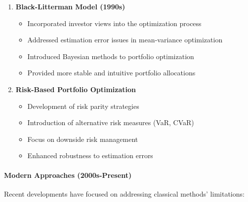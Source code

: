 \begin{enumerate}
    \item \textbf{Black-Litterman Model (1990s)}
    \begin{itemize}
        \item Incorporated investor views into the optimization process
        \item Addressed estimation error issues in mean-variance optimization
        \item Introduced Bayesian methods to portfolio optimization
        \item Provided more stable and intuitive portfolio allocations
    \end{itemize}

    \item \textbf{Risk-Based Portfolio Optimization}
    \begin{itemize}
        \item Development of risk parity strategies \parencite{qian2005risk}
        \item Introduction of alternative risk measures (VaR, CVaR)
        \item Focus on downside risk management
        \item Enhanced robustness to estimation errors
    \end{itemize}
\end{enumerate}

\paragraph{Modern Approaches (2000s-Present)}
Recent developments have focused on addressing classical methods' limitations:

